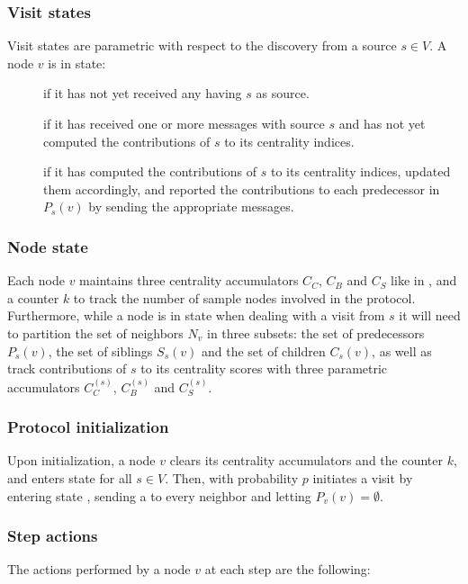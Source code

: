 \subsubsection{Visit states}

Visit states are parametric with respect to the discovery from a source $s \in V$. A node $v$ is in state:
\begin{description}
\item[] if it has not yet received any \mdisc{} having $s$ as source.
\item[] if it has received one or more \mdisc{} messages with source $s$ and has not yet computed the contributions of $s$ to its centrality indices.
\item[] if it has computed the contributions of $s$ to its centrality indices, updated them accordingly, and reported the contributions to each predecessor in $P_s(v)$ by sending the appropriate \mrep{} messages.
\end{description}

\subsubsection{Node state}
Each node $v$ maintains three centrality accumulators $C_C$, $C_B$ and $C_S$ like in \deccen{}, and a counter $k$ to track the number of sample nodes involved in the protocol. Furthermore, while a node is in state  when dealing with a visit from $s$ it will need to partition the set of neighbors $N_v$ in three subsets: the set of predecessors $P_s(v)$, the set of siblings $S_s(v)$ and the set of children $C_s(v)$, as well as track contributions of $s$ to its centrality scores with three parametric accumulators $C_C^{(s)}$, $C_B^{(s)}$ and $C_S^{(s)}$.

\subsubsection{Protocol initialization}
Upon initialization, a node $v$ clears its centrality accumulators and the counter $k$, and enters state  for all $s \in V$. Then, with probability $p$ initiates a visit by entering state , sending a  to every neighbor and letting $P_v(v) = \emptyset$.

\subsubsection{Step actions}
\label{multibfs:step}
The actions performed by a node $v$ at each step are the following:

